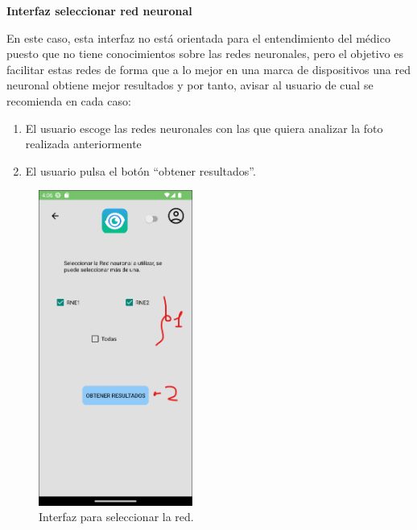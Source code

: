 \textbf{Interfaz seleccionar red neuronal}

En este caso, esta interfaz no está orientada para el entendimiento del médico puesto que no tiene conocimientos sobre las redes neuronales, pero el objetivo es facilitar estas redes de forma que a lo mejor en una marca de dispositivos una red neuronal obtiene mejor resultados y por tanto, avisar al usuario de cual se recomienda en cada caso:
\begin{enumerate}
    \def\labelenumi{\arabic{enumi}.}
    \tightlist
    \item El usuario escoge las redes neuronales con las que quiera analizar la foto realizada anteriormente
    \item El usuario pulsa el botón ``obtener resultados''.
\end{enumerate}
\begin{figure}[!ht]
         \centering
         \includegraphics[width=0.45\textwidth]{img/Interfaz seleccionarRNE.png}
         \caption{Interfaz para seleccionar la red.}
         \label{fig:InterfazSeleccionarRNE}
\end{figure}
